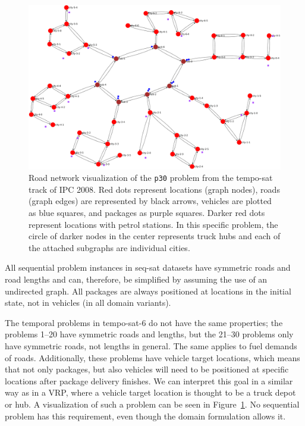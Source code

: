 \begin{figure}[tbp]
\centering
\includegraphics[width=1.0\textwidth]{../img/ipc08_tempo-sat_p30_land}
\caption[Road network visualization of the \texttt{p30} problem from the tempo-sat track of IPC 2008.]{Road network visualization of the \texttt{p30} problem from the tempo-sat track of IPC 2008. Red dots represent locations (graph nodes), roads (graph edges) are represented by black arrows, vehicles are plotted as blue squares, and packages as purple squares. Darker red dots represent locations with petrol stations. In this specific problem, the circle of darker nodes in the center represents truck hubs and each of the attached subgraphs are individual cities.}
\label{fig:ipc08_tempo-sat_p30}
\end{figure}

All sequential problem instances in seq-sat datasets have symmetric roads and road lengths and can, therefore,
be simplified by assuming the use of an undirected graph.
All packages are always positioned at locations
in the initial state, not in vehicles (in all domain variants).

The temporal problems in tempo-sat-6 do not have the same properties;
the problems 1--20 have symmetric roads and lengths, but
the 21--30 problems only have symmetric roads, not lengths in general.
The same applies to fuel demands of roads. Additionally,
these problems have vehicle target locations, which means that not only packages,
but also
vehicles will need to be positioned at specific locations
after package delivery finishes. We can interpret this goal
in a similar way as in a VRP, where a vehicle target location is thought to be
a truck depot or hub. A visualization of such a problem can be seen in Figure~\ref{fig:ipc08_tempo-sat_p30}.
No sequential problem has this requirement, even though the domain formulation allows it.

